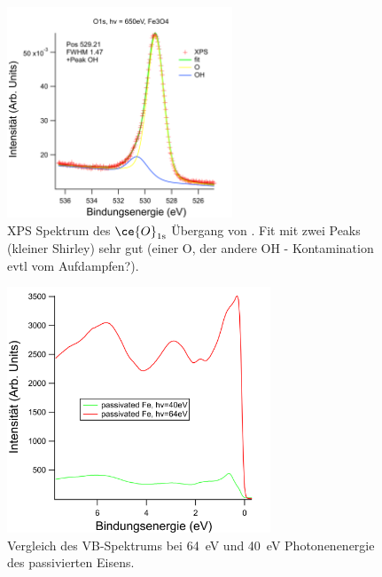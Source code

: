             \begin{figure}
                \centering
                \includegraphics[width=0.6\textwidth]{./content/pictures/Fe3O4/O1s_Fe3O4.png}
                \caption{XPS Spektrum des $\ce{O}_{1\text{s}}$ Übergang von . Fit mit zwei Peaks (kleiner Shirley) sehr gut (einer O, der andere OH - Kontamination evtl vom Aufdampfen?).}
                \label{fig:XPSO1s_Fe3O4}
            \end{figure}
            \begin{figure}
                \centering
                \includegraphics[width=0.7\textwidth]{./content/pictures/pFe/Photonenenergie.png}
                \caption{Vergleich des VB-Spektrums bei \SI{64}{\electronvolt} und \SI{40}{\electronvolt} Photonenenergie des passivierten Eisens.}
                \label{fig:Photonenenergie}
            \end{figure}

